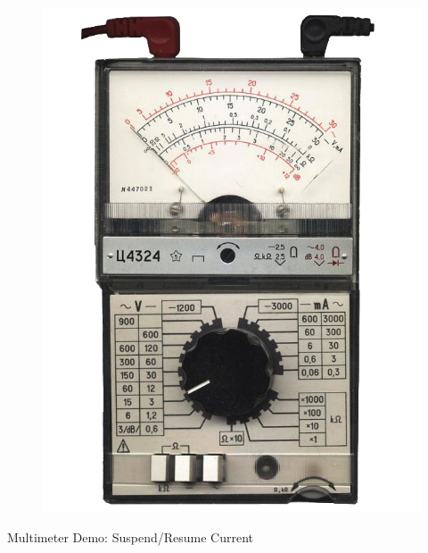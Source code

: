 \begin{frame}[standout]
  \begin{figure}
    \centering
    \includegraphics[scale=0.8]{images/multimeter.png}
  \end{figure}
  Multimeter Demo: Suspend/Resume Current
\end{frame}

